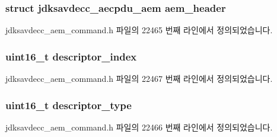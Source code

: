\subsubsection[{\texorpdfstring{aem\+\_\+header}{aem_header}}]{\setlength{\rightskip}{0pt plus 5cm}struct {\bf jdksavdecc\+\_\+aecpdu\+\_\+aem} aem\+\_\+header}\hypertarget{structjdksavdecc__aem__command__get__matrix_ae1e77ccb75ff5021ad923221eab38294}{}\label{structjdksavdecc__aem__command__get__matrix_ae1e77ccb75ff5021ad923221eab38294}


jdksavdecc\+\_\+aem\+\_\+command.\+h 파일의 22465 번째 라인에서 정의되었습니다.

\subsubsection[{\texorpdfstring{descriptor\+\_\+index}{descriptor_index}}]{\setlength{\rightskip}{0pt plus 5cm}uint16\+\_\+t descriptor\+\_\+index}\hypertarget{structjdksavdecc__aem__command__get__matrix_a042bbc76d835b82d27c1932431ee38d4}{}\label{structjdksavdecc__aem__command__get__matrix_a042bbc76d835b82d27c1932431ee38d4}


jdksavdecc\+\_\+aem\+\_\+command.\+h 파일의 22467 번째 라인에서 정의되었습니다.

\subsubsection[{\texorpdfstring{descriptor\+\_\+type}{descriptor_type}}]{\setlength{\rightskip}{0pt plus 5cm}uint16\+\_\+t descriptor\+\_\+type}\hypertarget{structjdksavdecc__aem__command__get__matrix_ab7c32b6c7131c13d4ea3b7ee2f09b78d}{}\label{structjdksavdecc__aem__command__get__matrix_ab7c32b6c7131c13d4ea3b7ee2f09b78d}


jdksavdecc\+\_\+aem\+\_\+command.\+h 파일의 22466 번째 라인에서 정의되었습니다.

